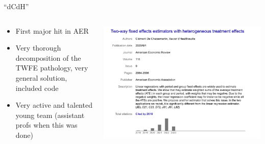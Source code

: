 \documentclass{beamer}
\begin{document}
\begin{frame}{``dCdH''}
  \begin{columns}
    \begin{column}{0.5\textwidth}
      \begin{itemize}
\item First major hit in AER
\item Very thorough decomposition of the TWFE pathology, very general solution, included code
\item Very active and talented young team (assistant profs when this was done)
      \end{itemize}
    \end{column}
    \begin{column}{0.5\textwidth}
      \includegraphics[scale=0.25]{./lecture_includes/dcdh_cites}
    \end{column}
  \end{columns}
\end{frame}
\end{document}
